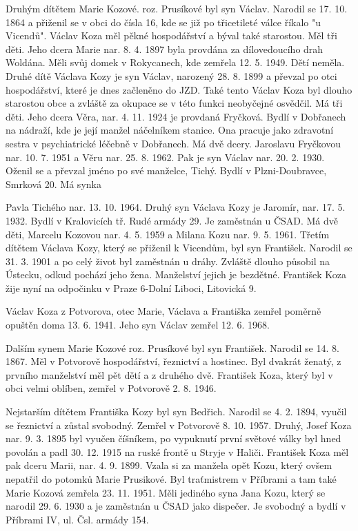 \documentclass[../dejiny-rodu-prusiku.tex]{subfiles}
\begin{document}
Druhým dítětem Marie Kozové. roz. Prusíkové byl syn Václav. Narodil se 17. 10. 1864 a přiženil se v obci do čísla 16, kde se již po třicetileté válce říkalo "u Vicendů". Václav Koza měl pěkné hospodářství a býval také starostou. Měl tři děti. Jeho dcera Marie nar. 8. 4. 1897 byla provdána za dílovedoucího drah Woldána. Měli svůj domek v Rokycanech, kde zemřela 12. 5. 1949. Dětí neměla. Druhé dítě Václava Kozy je syn Václav, narozený 28. 8. 1899 a převzal po otci hospodářství, které je dnes začleněno do JZD. Také tento Václav Koza byl dlouho starostou obce a zvláště za okupace se v této funkci neobyčejné osvědčil. Má tři děti. Jeho dcera Věra, nar. 4. 11. 1924 je provdaná Fryčková. Bydlí v Dobřanech na nádraží, kde je její manžel náčelníkem stanice. Ona pracuje jako zdravotní sestra v psychiatrické léčebně v Dobřanech. Má dvě dcery. Jaroslavu Fryčkovou nar. 10. 7. 1951 a Věru nar. 25. 8. 1962. Pak je syn Václav nar. 20. 2. 1930. Oženil se a převzal jméno po své manželce, Tichý. Bydlí v Plzni-Doubravce, Smrková 20. Má synka

Pavla Tichého nar. 13. 10. 1964. Druhý syn Václava Kozy je Jaromír, nar. 17. 5. 1932. Bydlí v Kralovicích tř. Rudé armády 29. Je zaměstnán u ČSAD. Má dvě děti, Marcelu Kozovou nar. 4. 5. 1959 a Milana Kozu nar. 9. 5. 1961. Třetím dítětem Václava Kozy, který se přiženil k Vicendům, byl syn František. Narodil se 31. 3. 1901 a po celý život byl zaměstnán u dráhy. Zvláště dlouho působil na Ústecku, odkud pochází jeho žena. Manželství jejich je bezdětné. František Koza žije nyní na odpočinku v Praze 6-Dolní Liboci, Litovická 9.

Václav Koza z Potvorova, otec Marie, Václava a Františka zemřel poměrně opuštěn doma 13.  6. 1941. Jeho syn Václav zemřel 12. 6. 1968.

Dalším synem Marie Kozové roz. Prusíkové byl syn František. Narodil se 14. 8. 1867. Měl v Potvorově hos­podářství, řeznictví a hostinec. Byl dvakrát ženatý, z prvního manželství měl pět dětí a z druhého dvě. František Koza, který byl v obci velmi oblíben, zemřel v Potvorově 2. 8. 1946.

Nejstarším dítětem Františka Kozy byl syn Bedřich. Narodil se 4. 2. 1894, vyučil se řeznictví a zůstal svobodný. Zemřel v Potvorově 8. 10. 1957. Druhý, Josef Koza nar. 9. 3. 1895 byl vyučen číšníkem, po vypuknutí první světové války byl hned povolán a padl 30. 12. 1915 na ruské frontě u Stryje v Haliči. František Koza měl pak dceru Marii, nar. 4. 9. 1899. Vzala si za manžela opět Kozu, který ovšem nepatřil do potomků Marie Prusikové. Byl traťmistrem v Příbrami a tam také Marie Kozová zemřela 23. 11. 1951. Měli jediného syna Jana Ko­zu, který se narodil 29. 6. 1930 a je zaměstnán u ČSAD jako dispečer. Je svobodný a bydlí v Příbrami IV, ul. Čsl. armády 154.
\end{document}
